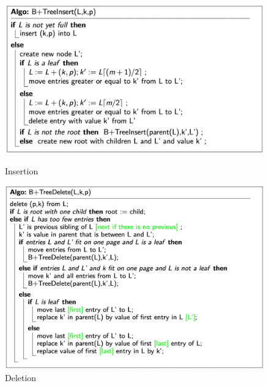 \begin{figure}
\centering
\begin{minipage}{.5\textwidth}
  \centering
  \includegraphics[width=1\linewidth]{images/Screenshot 2024-05-22 at 16.58.30.jpg}
  \caption{Insertion}
  \label{fig:test1}
\end{minipage}%
\begin{minipage}{.5\textwidth}
  \centering
  \includegraphics[width=1\linewidth]{images/Screenshot 2024-05-22 at 16.59.12.jpg}
  \caption{Deletion}
  \label{fig:test2}
\end{minipage}
\end{figure}



